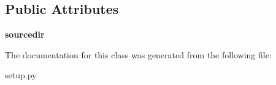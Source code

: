\subsection*{Public Attributes}
\begin{DoxyCompactItemize}
\item 
\mbox{\label{classsetup_1_1CMakeExtension_a29a643870fbe57b4181a02fb4d57b9f7}} 
{\bfseries sourcedir}
\end{DoxyCompactItemize}


The documentation for this class was generated from the following file\+:\begin{DoxyCompactItemize}
\item 
setup.\+py\end{DoxyCompactItemize}
